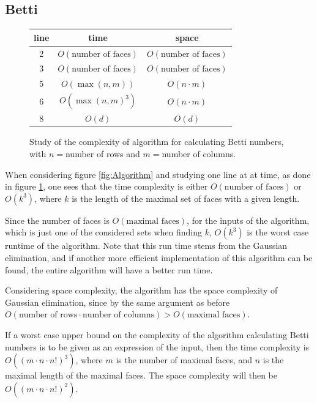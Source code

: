 \documentclass[11pt,a4paper,twoside]{report}
\begin{document}
\subsection{Betti}
\begin{figure}[H]
\center
\begin{tabular}{c|c|c}
line&time&space\\
\hline
2&$O(\text{number of faces})$&$O(\text{number of faces})$\\
3&$O(\text{number of faces})$&$O(\text{number of faces})$\\
5&$O(\max(n,m))$&$O(n\cdot m)$\\
6&$O(\max(n,m)^3)$&$O(n\cdot m)$\\
8&$O(d)$&$O(d)$\\
\end{tabular}
\caption{Study of the complexity of algorithm for calculating Betti numbers, with $n=$number of rows and $m=$number of columns.}
\label{fig:runtime}
\end{figure}
When considering figure \ref{fig:Algorithm} and studying one line at at time, as done in figure \ref{fig:runtime}, one sees that the time complexity is either $O(\text{number of faces})$ or $O(k^3)$, where $k$ is the length of the maximal set of faces with a given length.

Since the number of faces is $O(\text{maximal faces})$, for the inputs of the algorithm, which is just one of the considered sets when finding $k$, $O(k^3)$ is the worst case runtime of the algorithm. Note that this run time stems from the Gaussian elimination, and if another more efficient implementation of this algorithm can be found, the entire algorithm will have a better run time.

Considering space complexity, the algorithm has the space complexity of Gaussian elimination, since by the same argument as before $O(\text{number of rows}\cdot \text{number of columns})>O(\text{maximal faces})$.

If a worst case upper bound on the complexity of the algorithm calculating Betti numbers is to be given as an expression of the input, then the time complexity is $O((m\cdot n\cdot n!)^3)$, where $m$ is the number of maximal faces, and $n$ is the maximal length of the maximal faces. The space complexity will then be $O((m\cdot n\cdot n!)^2)$.
\end{document}
